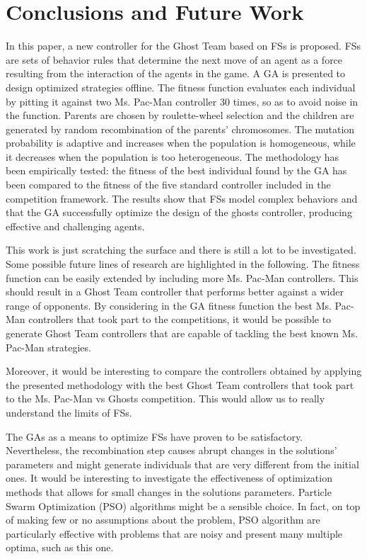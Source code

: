 \documentclass[a4paper]{llncs}
\begin{document}
%
%

\section{Conclusions and Future Work}
\label{sec:conclusions}

In this paper, a new controller for the Ghost Team based on FSs is proposed. FSs are sets of behavior rules that determine the next move of an agent as a force resulting from the interaction of the agents in the game. A GA is presented to design optimized strategies offline. The fitness function evaluates each individual by pitting it against two Ms. Pac-Man controller 30 times, so as to avoid noise in the function. Parents are chosen by roulette-wheel selection and the children are generated by random recombination of the parents' chromosomes. The mutation probability is adaptive and increases when the population is homogeneous, while it decreases when the population is too heterogeneous. The methodology has been empirically tested: the fitness of the best individual found by the GA has been compared to the fitness of the five standard controller included in the competition framework. The results show that FSs model complex behaviors and that the GA successfully optimize the design of the ghosts controller, producing effective and challenging agents.

This work is just scratching the surface and there is still a lot to be investigated. Some possible future lines of research are highlighted in the following. The fitness function can be easily extended by including more Ms. Pac-Man controllers. This should result in a Ghost Team controller that performs better against a wider range of opponents. By considering in the GA fitness function the best Ms. Pac-Man controllers that took part to the competitions, it would be possible to generate Ghost Team controllers that are capable of tackling the best known Ms. Pac-Man strategies. 

Moreover, it would be interesting to compare the controllers obtained by applying the presented methodology with the best Ghost Team controllers that took part to the Ms. Pac-Man vs Ghosts competition. This would allow us to really understand the limits of FSs.

The GAs as a means to optimize FSs have proven to be satisfactory. Nevertheless, the recombination step causes abrupt changes in the solutions' parameters and might generate individuals that are very different from the initial ones. It would be interesting to investigate the effectiveness of optimization methods that allows for small changes in the solutions parameters. Particle Swarm Optimization (PSO) algorithms  might be a sensible choice. In fact, on top of making few or no assumptions about the problem, PSO algorithm are particularly effective with problems that are noisy and present many multiple optima, such as this one.
\end{document}
